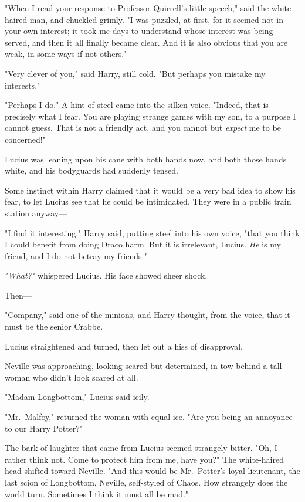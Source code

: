 "When I read your response to Professor Quirrell's little speech," said the
white-haired man, and chuckled grimly. "I was puzzled, at first, for it seemed
not in your own interest; it took me days to understand whose interest was
being served, and then it all finally became clear. And it is also obvious that
you are weak, in some ways if not others."

"Very clever of you," said Harry, still cold. "But perhaps you mistake my
interests."

"Perhaps I do." A hint of steel came into the silken voice. "Indeed, that is
precisely what I fear. You are playing strange games with my son, to a purpose
I cannot guess. That is not a friendly act, and you cannot but \emph{expect} me
to be concerned!"

Lucius was leaning upon his cane with both hands now, and both those hands
white, and his bodyguards had suddenly tensed.

Some instinct within Harry claimed that it would be a very bad idea to show his
fear, to let Lucius see that he could be intimidated. They were in a public
train station anyway---

"I find it interesting," Harry said, putting steel into his own voice, "that
you think I could benefit from doing Draco harm. But it is irrelevant, Lucius.
\emph{He} is my friend, and I do not betray my friends."

\emph{"What?"} whispered Lucius. His face showed sheer shock.

Then---

"Company," said one of the minions, and Harry thought, from the voice, that it
must be the senior Crabbe.

Lucius straightened and turned, then let out a hiss of disapproval.

Neville was approaching, looking scared but determined, in tow behind a tall
woman who didn't look scared at all.

"Madam Longbottom," Lucius said icily.

"Mr.~Malfoy," returned the woman with equal ice. "Are you being an annoyance to
our Harry Potter?"

The bark of laughter that came from Lucius seemed strangely bitter. "Oh, I
rather think not. Come to protect him from me, have you?" The white-haired head
shifted toward Neville. "And this would be Mr.~Potter's loyal lieutenant, the
last scion of Longbottom, Neville, self-styled of Chaos. How strangely does the
world turn. Sometimes I think it must all be mad."

